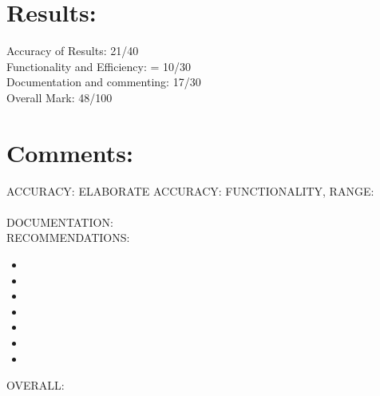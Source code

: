 \documentclass[11pt]{article} %
\begin{document}

\section{Results:}

Accuracy of Results: 21/40 \\
Functionality and Efficiency: = 10/30 \\ 
Documentation and commenting: 17/30 \\ 
Overall Mark: 48/100 \\

\section{Comments:}

ACCURACY:
ELABORATE ACCURACY:
FUNCTIONALITY, RANGE:
\\
\\ 
DOCUMENTATION:
\\
RECOMMENDATIONS:
\begin{itemize}
\item {}
\item {}
\item {}
\item {}
\item {}
\item {}
\item {}
\end{itemize}
OVERALL: 
\end{document}
